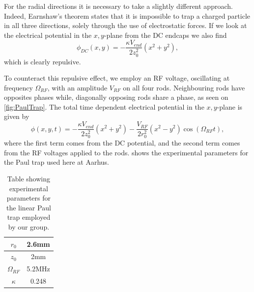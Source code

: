 For the radial directions it is necessary to take a slightly different approach. Indeed, Earnshaw's theorem \cite{EarnshawOnTN} states
that it is impossible to trap a charged particle in all three directions, solely through the use of electrostatic forces. If we look at the electrical potential in the $x,y$-plane from the DC endcaps we also find
\begin{equation}
    \phi_{DC}(x,y) = -\frac{\kappa V_{end}}{2z_0^2}(x^2+y^2),
\end{equation}
which is clearly repulsive.

To counteract this repulsive effect, we employ an RF voltage, oscillating at frequency $\Omega_{RF}$, with an amplitude $V_{RF}$ on all four rods. Neighbouring rods have opposites phases while, diagonally opposing rods share a phase, as seen on \cref{fig:PaulTrap}.
The total time dependent electrical potential in the $x,y$-plane is given by \cite{Fisher_2017}
\begin{equation}
    \phi(x,y,t) = -\frac{\kappa V_{end}}{2z_0^2}(x^2+y^2)-\frac{V_{RF}}{2r_0^2}(x^2-y^2)\cos{(\Omega_{RF}t)},
\end{equation}
where the first term comes from the DC potential, and the second term comes from the RF voltages applied to the rods.  shows the experimental parameters for the Paul trap used here at Aarhus.

\begin{table}[h]
    \centering
    \begin{tabular}{|c|c|}
    \hline
    $r_0$         & 2.6mm  \\ \hline
    $z_0$         & 2mm    \\ \hline
    $\Omega_{RF}$ & 5.2MHz \\ \hline
    $\kappa$      & 0.248  \\ \hline
    \end{tabular}
    \caption{Table showing experimental parameters for the linear Paul trap employed by our group.}
    \label{tab:params}
    \end{table}


